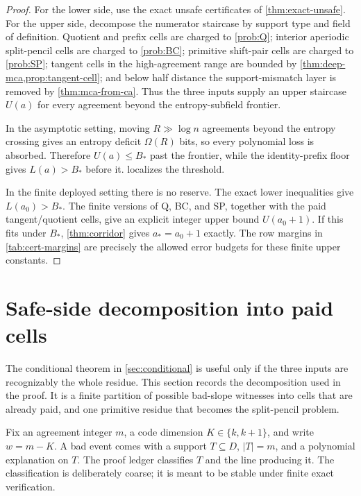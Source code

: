 \documentclass[11pt]{article}
\theoremstyle{definition}
\theoremstyle{remark}
\begin{document}
\begin{proof}
For the lower side, use the exact unsafe certificates of \cref{thm:exact-unsafe}.  For the upper side, decompose the numerator staircase by support type and field of definition.  Quotient and prefix cells are charged to \cref{prob:Q}; interior aperiodic split-pencil cells are charged to \cref{prob:BC}; primitive shift-pair cells are charged to \cref{prob:SP}; tangent cells in the high-agreement range are bounded by \cref{thm:deep-mca,prop:tangent-cell}; and below half distance the support-mismatch layer is removed by \cref{thm:mca-from-ca}.  Thus the three inputs supply an upper staircase \(U(a)\) for every agreement beyond the entropy-subfield frontier.

In the asymptotic setting, moving \(R\gg\log n\) agreements beyond the entropy crossing gives an entropy deficit \(\Omega(R)\) bits, so every polynomial loss is absorbed.  Therefore \(U(a)\le B_*\) past the frontier, while the identity-prefix floor gives \(L(a)>B_*\) before it.   localizes the threshold.

In the finite deployed setting there is no reserve.  The exact lower inequalities give \(L(a_0)>B_*\).  The finite versions of Q, BC, and SP, together with the paid tangent/quotient cells, give an explicit integer upper bound \(U(a_0+1)\).  If this fits under \(B_*\), \cref{thm:corridor} gives \(a_*=a_0+1\) exactly.  The row margins in \cref{tab:cert-margins} are precisely the allowed error budgets for these finite upper constants.
\end{proof}



\section{Safe-side decomposition into paid cells}\label{sec:cell-decomp}

The conditional theorem in \cref{sec:conditional} is useful only if the three inputs are recognizably the whole residue.  This section records the decomposition used in the proof.  It is a finite partition of possible bad-slope witnesses into cells that are already paid, and one primitive residue that becomes the split-pencil problem.

Fix an agreement integer \(m\), a code dimension \(K\in\{k,k+1\}\), and write \(w=m-K\).  A bad event comes with a support \(T\subseteq D\), \(|T|=m\), and a polynomial explanation on \(T\).  The proof ledger classifies \(T\) and the line producing it.  The classification is deliberately coarse; it is meant to be stable under finite exact verification.
\end{document}
